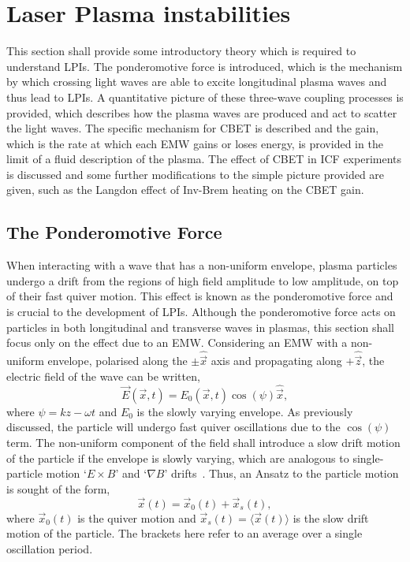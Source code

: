 \section{Laser Plasma instabilities}%
\label{sec:theory_LPIs}

This section shall provide some introductory theory which is required to understand \ac{LPIs}.
The ponderomotive force is introduced, which is the mechanism by which crossing light waves are able to excite longitudinal plasma waves and thus lead to \ac{LPIs}.
A quantitative picture of these three-wave coupling processes is provided, which describes how the plasma waves are produced and act to scatter the light waves.
The specific mechanism for \ac{CBET} is described and the gain, which is the rate at which each \ac{EMW} gains or loses energy, is provided in the limit of a fluid description of the plasma.
The effect of \ac{CBET} in \ac{ICF} experiments is discussed and some further modifications to the simple picture provided are given, such as the Langdon effect of \ac{Inv-Brem} heating on the \ac{CBET} gain.

\subsection{The Ponderomotive Force}%
\label{sec:theory_ponderomotive }

When interacting with a wave that has a non-uniform envelope, plasma particles undergo a drift from the regions of high field amplitude to low amplitude, on top of their fast quiver motion.
This effect is known as the ponderomotive force and is crucial to the development of \ac{LPIs}.
Although the ponderomotive force acts on particles in both longitudinal and transverse waves in plasmas, this section shall focus only on the effect due to an \ac{EMW}.
Considering an \ac{EMW} with a non-uniform envelope, polarised along the $\pm \hat{\vec{x}}$ axis and propagating along $+\hat{\vec{z}}$, the electric field of the wave can be written,
\begin{equation}
    \vec{E}(\vec{x},t) = E_0(\vec{x},t)\cos{(\psi)}\hat{\vec{x}},
\end{equation}
where $\psi = kz - \omega t$ and $E_0$ is the slowly varying envelope.
As previously discussed, the particle will undergo fast quiver oscillations due to the $\cos{(\psi)}$ term.
The non-uniform component of the field shall introduce a slow drift motion of the particle if the envelope is slowly varying, which are analogous to single-particle motion `$E\times B$' and `$\nabla B$' drifts~\cite{chen_introduction_2018}.
Thus, an Ansatz to the particle motion is sought of the form,
\begin{equation}
    \label{eq:theory_ponder_ansatz}
    \vec{x}(t) = \vec{x}_0(t) + \vec{x}_s(t),
\end{equation}
where $\vec{x}_0(t)$ is the quiver motion and $\vec{x}_s(t)=\langle\vec{x}(t)\rangle$ is the slow drift motion of the particle.
The brackets here refer to an average over a single oscillation period.

